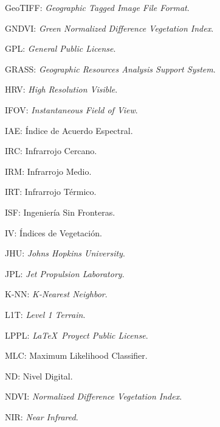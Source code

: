 GeoTIFF: \textit{Geographic Tagged Image File Format}.

GNDVI: \textit{Green Normalized Difference Vegetation Index}.

GPL: \textit{General Public License}.

GRASS: \textit{Geographic Resources Analysis Support System}.

HRV: \textit{High Resolution Visible}.

IFOV: \textit{Instantaneous Field of View}.

IAE: Índice de Acuerdo Espectral.

IRC: Infrarrojo Cercano.

IRM: Infrarrojo Medio.

IRT: Infrarrojo Térmico.

ISF: Ingeniería Sin Fronteras.

IV: Índices de Vegetación.

JHU: \textit{Johns Hopkins University}.

JPL: \textit{Jet Propulsion Laboratory}.

K-NN: \textit{K-Nearest Neighbor}.

L1T: \textit{Level 1 Terrain}.

LPPL: \textit{\LaTeX\ Proyect Public License}.

MLC: Maximum Likelihood Classifier.

ND: Nivel Digital.

NDVI: \textit{Normalized Difference Vegetation Index}.

NIR: \textit{Near Infrared}.

